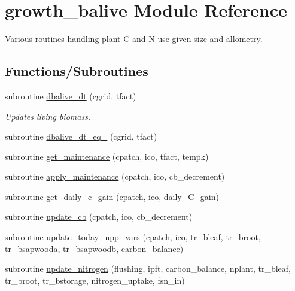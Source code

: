 \hypertarget{namespacegrowth__balive}{}\section{growth\+\_\+balive Module Reference}
\label{namespacegrowth__balive}


Various routines handling plant C and N use given size and allometry.  


\subsection*{Functions/\+Subroutines}
\begin{DoxyCompactItemize}
\item 
subroutine \hyperlink{namespacegrowth__balive_a7781ae229b2399c90d50858382665ee8}{dbalive\+\_\+dt} (cgrid, tfact)
\begin{DoxyCompactList}\small\item\em Updates living biomass. \end{DoxyCompactList}\item 
subroutine \hyperlink{namespacegrowth__balive_a15cba39e9b70b8dd6a1e2d0cbdd5cc2e}{dbalive\+\_\+dt\+\_\+eq\+\_} (cgrid, tfact)
\item 
subroutine \hyperlink{namespacegrowth__balive_ac2f667372e6f2a5fc7329466cc958a6c}{get\+\_\+maintenance} (cpatch, ico, tfact, tempk)
\item 
subroutine \hyperlink{namespacegrowth__balive_a861b85f31215415551f4a9c03302ff6e}{apply\+\_\+maintenance} (cpatch, ico, cb\+\_\+decrement)
\item 
subroutine \hyperlink{namespacegrowth__balive_ad43c7e3fcb88db17077ed58aeab8fe2d}{get\+\_\+daily\+\_\+c\+\_\+gain} (cpatch, ico, daily\+\_\+\+C\+\_\+gain)
\item 
subroutine \hyperlink{namespacegrowth__balive_ac4ca7901eed6321044f171f6f1b8d7d6}{update\+\_\+cb} (cpatch, ico, cb\+\_\+decrement)
\item 
subroutine \hyperlink{namespacegrowth__balive_a6c0ddec560e65b6d58be7041bd8dade2}{update\+\_\+today\+\_\+npp\+\_\+vars} (cpatch, ico, tr\+\_\+bleaf, tr\+\_\+broot, tr\+\_\+bsapwooda, tr\+\_\+bsapwoodb, carbon\+\_\+balance)
\item 
subroutine \hyperlink{namespacegrowth__balive_a8599682ade194a107377a540d7e64c73}{update\+\_\+nitrogen} (flushing, ipft, carbon\+\_\+balance, nplant, tr\+\_\+bleaf, tr\+\_\+broot, tr\+\_\+bstorage, nitrogen\+\_\+uptake, fsn\+\_\+in)
\item 

\end{DoxyCompactItemize}
